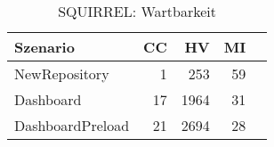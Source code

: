 \begin{table}[ht]
\centering
\caption{SQUIRREL: Wartbarkeit}
\begin{tabular}{lrrrr}
\toprule
Szenario & CC & HV & MI \\
\midrule
	NewRepository & 1 & 253 & 59 \\
	Dashboard & 17 & 1964 & 31 \\
	DashboardPreload & 21 & 2694 & 28 \\
\bottomrule
\end{tabular}
\label{tab:squirrel_maintainability}
\end{table}
	